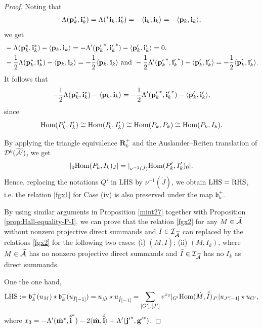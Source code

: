 \documentclass[reqno,12pt]{amsart}
\numberwithin{equation}{section}
\def\lr#1{\langle #1\rangle} \def\fin{\hfill$\square$}  \def\lra{\longrightarrow} \def\mod{\mbox{\rm \textbf{mod}}\,}\def\Mod{\mbox{\rm mod}\,}\def\top{\mbox{\rm top}\,}\def\soc{\mbox{\rm soc}\,}
\theoremstyle{plain} %
\theoremstyle{definition} %
\begin{document}
\begin{proof}
Noting that \begin{align*}\Lambda({\bf p}_k^\ast,{\bf i}_k^\ast)=\Lambda(^\ast{\bf i}_k,{\bf i}_k^\ast)=
-\lr{{\bf i}_k,{\bf i}_k}=-\lr{{\bf p}_k,{\bf i}_k},
\end{align*}
we get \begin{align*}&-\Lambda({\bf p}_k^\ast,{\bf i}_k^\ast)-\lr{{\bf p}_k,{\bf i}_k}=-\Lambda'({{\bf p}_k'}^\ast,{{\bf i}_k'}^\ast)-\lr{{\bf p}'_k,{\bf i}'_k}=0,\\
&-\frac{1}{2}\Lambda({\bf p}_k^\ast,{\bf i}_k^\ast)-\lr{{\bf p}_k,{\bf i}_k}=-\frac{1}{2}\lr{{\bf p}_k,{\bf i}_k}~\text{and}~-\frac{1}{2}\Lambda'({{\bf p}_k'}^\ast,{{\bf i}_k'}^\ast)-\lr{{\bf p}'_k,{\bf i}'_k}=-\frac{1}{2}\lr{{\bf p}'_k,{\bf i}'_k}.\end{align*}
It follows that $$-\frac{1}{2}\Lambda({\bf p}_k^\ast,{\bf i}_k^\ast)-\lr{{\bf p}_k,{\bf i}_k}=-\frac{1}{2}\Lambda'({{\bf p}_k'}^\ast,{{\bf i}_k'}^\ast)-\lr{{\bf p}'_k,{\bf i}'_k},$$ since $$\mbox{\rm Hom}(P'_k,I'_k)\cong \mbox{\rm Hom}(I'_k,I'_k)\cong \mbox{\rm Hom}(P_k,P_k)\cong \mbox{\rm Hom}(P_k,I_k).$$

By applying the triangle equivalence $\mathbf{R}_k^+$ and the Auslander--Reiten translation of $\mathcal{D}^b(\widetilde{{\mathcal{A}'}})$, we get
\begin{align*}|{}_{0}\mbox{\rm Hom}(P_k,I_k)_{J}|=|{}_{\nu^{-1}(\acute{J})}\mbox{\rm Hom}(P'_k,I'_k)_{0}|.\end{align*}
Hence, replacing the notations $Q'$ in {\rm LHS} by $\nu^{-1}(\acute{J})$, we obtain
${\rm LHS}={\rm RHS}$, i.e. the relation \eqref{fgx1} for Case (iv) is also preserved under the map $\mathfrak{b}_k^+$.
	
By using similar arguments in Proposition \ref{mint27} together with Proposition \ref{prop:Hall-equality-P-I}, we can prove that the relation \eqref{fgx2} for any $M\in\widetilde{\mathcal{A}}$ without nonzero projective direct summands and $I\in\mathcal{I}_{\widetilde{\mathcal{A}}}$ can replaced by the relations \eqref{fgx2} for the following two cases: (i) $(M,\bar{I})$; (ii) $(M, I_k)$, where $M\in\widetilde{\mathcal{A}}$ has no nonzero projective direct summands and $\bar{I}\in\mathcal{I}_{\widetilde{\mathcal{A}}}$ has no $I_k$ as direct summands.

	
One the one hand,
\begin{align*}
{\rm LHS}:=\mathfrak{b}_k^+(u_M)\star\mathfrak{b}_k^+(u_{\bar{I}[-1]})=u_{\acute{M}}\star u_{\acute{\bar{I}}[-1]}
=\sum_{[G'],[J']}v^{x_3} |_{G'}\mbox{\rm Hom}({\acute{M}},\acute{\bar{I}})_{J'}|u_{J'[-1]}\star u_{G'},
\end{align*}
where $x_3=-\Lambda'({\acute{{\bf m}}}^\ast,{\acute{\bar{{\bf i}}}}^\ast)-2\langle \acute{{\bf m}},\acute{\bar{{\bf i}}}\rangle+\Lambda'({\bf j'}^\ast,{\bf g'}^\ast)$.


\end{proof}
\end{document}
